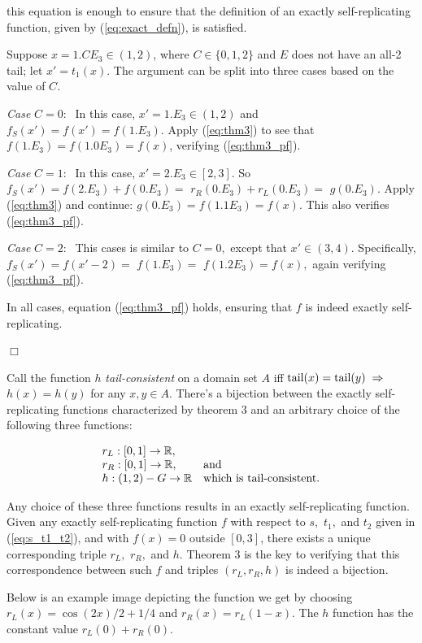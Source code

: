 \documentclass[20pt,]{extarticle}
\begin{document}
this equation is enough to ensure that the definition of an exactly
self-replicating function, given by (\ref{eq:exact_defn}), is satisfied.

Suppose \(x=1.CE_3 \in (1,2)\), where \(C \in \{0, 1, 2\}\) and \(E\)
does not have an all-2 tail; let \(x' = t_1(x)\). The argument can be
split into three cases based on the value of \(C\).

\emph{Case} \(C=0:\;\) In this case, \(x' = 1.E_3 \in (1, 2)\) and
\(f_S(x') = f(x') = f(1.E_3).\) Apply (\ref{eq:thm3}) to see that
\(f(1.E_3) = f(1.0E_3) = f(x)\), verifying (\ref{eq:thm3_pf}).

\emph{Case} \(C=1:\;\) In this case, \(x' = 2.E_3 \in [2,3].\) So
\(f_S(x') = f(2.E_3) + f(0.E_3) =\) \(r_R(0.E_3) + r_L(0.E_3) =\)
\(g(0.E_3).\) Apply (\ref{eq:thm3}) and continue:
\(g(0.E_3) = f(1.1E_3) = f(x).\) This also verifies (\ref{eq:thm3_pf}).

\emph{Case} \(C=2:\;\) This cases is similar to \(C=0,\) except that
\(x' \in (3,4).\) Specifically, \(f_S(x') = f(x'-2) =\) \(f(1.E_3) =\)
\(f(1.2E_3) = f(x),\) again verifying (\ref{eq:thm3_pf}).

In all cases, equation (\ref{eq:thm3_pf}) holds, ensuring that \(f\) is
indeed exactly self-replicating.

\hfill\(\Box\)

Call the function \(h\) \emph{tail-consistent} on a domain set \(A\) iff
\(\text{tail}(x) = \text{tail}(y) \;\Rightarrow\;\) \(h(x) = h(y)\) for any
\(x,y \in A.\) There's a bijection between the exactly self-replicating
functions characterized by theorem 3 and an arbitrary choice of the
following three functions:

\[\begin{array}{ll}
r_L : [0,1] \to \mathbb{R}, \\
r_R : [0,1] \to \mathbb{R}, & \text{and} \\
h   : (1,2) - G \to \mathbb{R} & \text{which is tail-consistent.}
\end{array}\]

Any choice of these three functions results in an exactly
self-replicating function. Given any exactly self-replicating function
\(f\) with respect to \(s,\) \(t_1,\) and \(t_2\) given in
(\ref{eq:s_t1_t2}), and with \(f(x) = 0\) outside \([0,3]\), there
exists a unique corresponding triple \(r_L,\) \(r_R,\) and \(h\).
Theorem 3 is the key to verifying that this correspondence between such
\(f\) and triples \((r_L, r_R, h)\) is indeed a bijection.

Below is an example image depicting the function we get by choosing
\(r_L(x) = \cos(2x)/2 + 1/4\) and \(r_R(x) = r_L(1-x)\). The \(h\)
function has the constant value \(r_L(0) + r_R(0)\).
\end{document}
